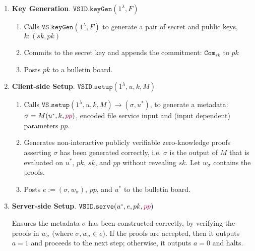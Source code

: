 

\begin{enumerate}
\item\textbf{Key Generation}\label{VSID::keygen}. $\mathtt{VSID.keyGen}(1^{\lambda},F)$ 
\begin{enumerate}
\item Calls  $\mathtt{VS.keyGen}(1^{\lambda},F)$ to generate a pair of secret and public keys, $k:(sk,pk)$
\item Commits to the secret key and appends the commitment: $\mathtt{Com}_{\scriptscriptstyle sk}$ to $pk$
\item Posts $pk$ to a bulletin board. %
\end{enumerate}

\item\textbf{Client-side Setup}\label{VSID::Client-side-Setup}. $\mathtt{VSID.setup}(1^{\lambda}, u,k,M)$
\begin{enumerate}
\item Calls  $\mathtt{VS.setup}(1^{\lambda}, u,k,M)\rightarrow (\sigma,u^{\scriptscriptstyle *})$, to generate a   metadata: $\sigma=M(u^{\scriptscriptstyle *},k,{\color{purple}pp})$, encoded file service input and {\color{purple} (input dependent) parameters $pp$}. %


\item Generates non-interactive publicly verifiable zero-knowledge proofs asserting  $\sigma$ has been generated correctly, i.e. $\sigma$ is the output of  $M$ that is evaluated on $u^{\scriptscriptstyle *}$, $pk$,  $sk$, and {\color{purple}$pp$} without revealing $sk$. Let $w_{\scriptscriptstyle\sigma}$ contains the proofs.
\item\label{vsid::post-metadata} Posts $ e:=(\sigma,w_{\scriptscriptstyle\sigma})$, {\color{purple}$pp$},  and $u^{\scriptscriptstyle *}$ to the bulletin board. 
\end{enumerate}

\item\textbf{Server-side Setup}. $\mathtt{VSID.serve}(u^{\scriptscriptstyle *},e,pk,{\color{purple}pp})$

Ensures the metadata $\sigma$ has been constructed correctly, by verifying the proofs in $w_{\sigma}$ (where $\sigma,w_{\scriptscriptstyle\sigma}\in e$). If the proofs are accepted, then it outputs $a=1$  and proceeds to the next step; otherwise, it outputs $a=0$ and halts. 


\end{enumerate}
